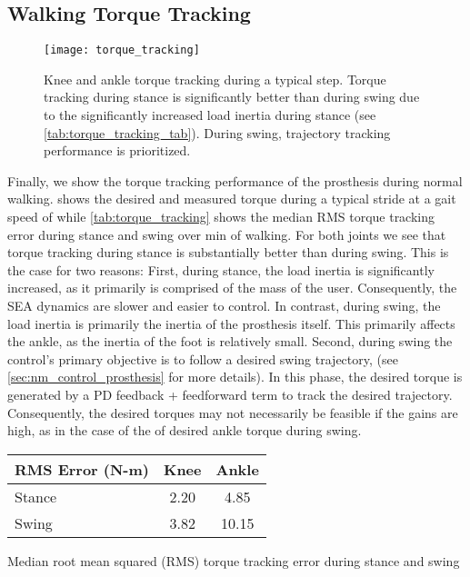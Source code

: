 \subsection{Walking Torque Tracking}
\begin{figure}[htb]
    \centering 
    \texttt{[image: torque\_tracking]}
    \caption{Knee and ankle torque tracking during a typical step. Torque
    tracking during stance is significantly better than during swing due to the
    significantly increased load inertia during stance (see
    \cref{tab:torque_tracking_tab}). During swing, trajectory tracking
    performance is prioritized.}\label{fig:torque_tracking_plot}
\end{figure}
Finally, we show the torque tracking performance of the prosthesis during normal
walking.  shows the desired and measured torque
during a typical stride at a gait speed of  while
\cref{tab:torque_tracking} shows the median RMS torque tracking error during
stance and swing over \unit[1]{min} of walking. For both joints we see that
torque tracking during stance is substantially better than during swing.  This
is the case for two reasons: First, during stance, the load inertia is
significantly increased, as it primarily is comprised of the mass of the user.
Consequently, the SEA dynamics are slower and easier to control. In contrast,
during swing, the load inertia is primarily the inertia of the prosthesis
itself. This primarily affects the ankle, as the inertia of the foot is
relatively small. Second, during swing the control's primary objective is to
follow a desired swing trajectory, (see \cref{sec:nm_control_prosthesis} for
more details). In this phase, the desired torque is generated by a PD feedback +
feedforward term to track the desired trajectory. Consequently, the desired
torques may not necessarily be feasible if the gains are high, as in the case of
the of desired ankle torque during swing.
\begin{margintable}[-1in]
    \centering
    \small
    \begin{tabular}{lcc}
        RMS Error (N-m) & Knee & Ankle \\
        \midrule
        Stance & 2.20 & 4.85  \\
        Swing  & 3.82 & 10.15 \\
    \end{tabular}
    \caption{Median root mean squared (RMS) torque tracking error during stance
    and swing}\label{tab:torque_tracking}
\end{margintable}
